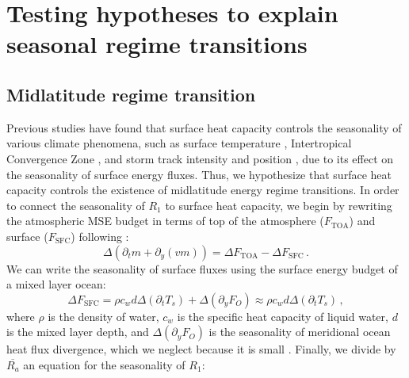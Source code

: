 \documentclass{ametsocV5}
\begin{document}
\section{Testing hypotheses to explain seasonal regime transitions} \label{sec:hypo}
  \subsection{Midlatitude regime transition} \label{subsec:mld}
  Previous studies have found that surface heat capacity controls the seasonality of various climate phenomena, such as surface temperature \citep{donohoe2014}, Intertropical Convergence Zone \citep{bordoni2008}, and storm track intensity and position \citep{barpanda2020}, due to its effect on the seasonality of surface energy fluxes. Thus, we hypothesize that surface heat capacity controls the existence of midlatitude energy  regime transitions. In order to connect the seasonality of $R_1$ to surface heat capacity, we begin by rewriting the atmospheric MSE budget in terms of top of the atmosphere ($F_\mathrm{TOA}$) and surface ($F_\mathrm{SFC}$) following \cite{barpanda2020}:
  \begin{equation}\label{eq:mse-toasfc}
    \Delta\left(\partial_t m + \partial_y (vm) \right) = \Delta F_{\mathrm{TOA}} - \Delta F_{\mathrm{SFC}} \, .
  \end{equation}
  We can write the seasonality of surface fluxes using the surface energy budget of a mixed layer ocean:
  \begin{equation}\label{eq:sfc-budget}
    \Delta F_{\mathrm{SFC}} = \rho c_{w} d \Delta\left(\partial_t T_{s}\right) + \Delta ( \partial_y F_{O}) \approx \rho c_{w} d \Delta\left(\partial_t T_{s}\right) \, ,
  \end{equation}
  where $\rho$ is the density of water, $c_w$ is the specific heat capacity of liquid water, $d$ is the mixed layer depth, and $\Delta(\partial_y F_O)$ is the seasonality of meridional ocean heat flux divergence, which we neglect because it is small \citep{roberts2017}. Finally, we divide by $\overline{R_a}$ an equation for the seasonality of $R_1$:
\end{document}
